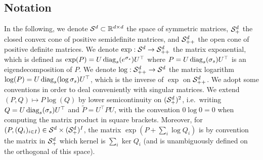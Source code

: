 % 


\subsection{Notation}

In the following, we denote $\mathcal{S}^d \subset \mathbb{R}^{d \times d}$ the space of symmetric matrices, $\mathcal{S}_+^d$ the closed convex cone of positive semidefinite matrices, and $\mathcal{S}_{++}^d$ the open cone of positive definite matrices. 
%
We denote $\exp: \mathcal{S}^d \to \mathcal{S}_{++}^d$ the matrix exponential, which is defined as $\exp(P)=U \operatorname{diag}_s(e^{\sigma_s})U^\top$ where $P=U \operatorname{diag}_s(\sigma_s) U^\top$ is an eigendecomposition of $P$.
We denote $\log: \mathcal{S}_{++}^d \to \mathcal{S}^d$ the matrix logarithm $\log(P)=U \operatorname{diag}_s(\log \sigma_s)U^\top$, which is the inverse of $\exp$ on $\mathcal{S}_{++}^d$. %
We adopt some conventions in order to deal conveniently with singular matrices.
%
We extend $(P,Q) \mapsto P \log (Q)$ by lower semicontinuity on $(\mathcal{S}_+^d)^2$, i.e.\ writing $Q = U \operatorname{diag}_s(\sigma_s) U^\top$ and $\tilde{P}=U^\top P U$, 
with the convention $0\log 0 = 0$ when computing the matrix product in square brackets. Moreover, for $(P,(Q_i)_{i\in I}) \in\mathcal{S}^d \times (\mathcal{S}_+^d)^I$, the matrix $\exp(P + \sum_i \log Q_i)$ is by convention the matrix in $\mathcal{S}_+^d$ which kernel is $\sum_i \ker Q_i$ (and is unambiguously defined on the orthogonal of this space).

